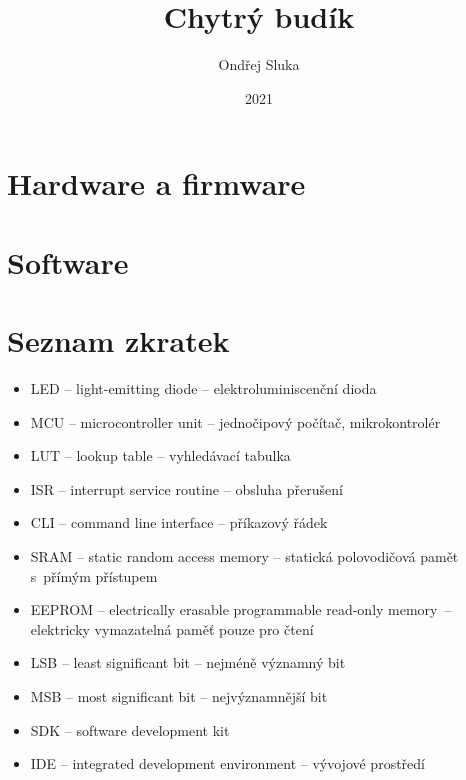 \documentclass[12pt,a4paper]{article}
\title{Chytrý budík}
\author{Ondřej Sluka}
\date{2021}  %
\begin{document}
\maketitle  %

\tableofcontents



\clearpage
\section{Hardware a firmware} %


%

\clearpage
\section{Software}  %



\printbibliography[title={Odkazy a~literatura}]  %


\section*{Seznam zkratek}
\begin{itemize}
    \item LED -- light-emitting diode -- elektroluminiscenční dioda
    \item MCU -- microcontroller unit -- jednočipový počítač, mikrokontrolér
    \item LUT -- lookup table -- vyhledávací tabulka
    \item ISR -- interrupt service routine -- obsluha přerušení
    \item CLI -- command line interface -- příkazový řádek
    \item SRAM -- static random access memory -- statická polovodičová pamět
          s~přímým přístupem
    \item EEPROM -- electrically erasable programmable read-only memory~--
          elektricky vymazatelná paměť pouze pro čtení
    \item LSB -- least significant bit -- nejméně významný bit
    \item MSB -- most significant bit -- nejvýznamnější bit
    \item SDK -- software development kit
    \item IDE -- integrated development environment -- vývojové prostředí
\end{itemize}
\end{document}

